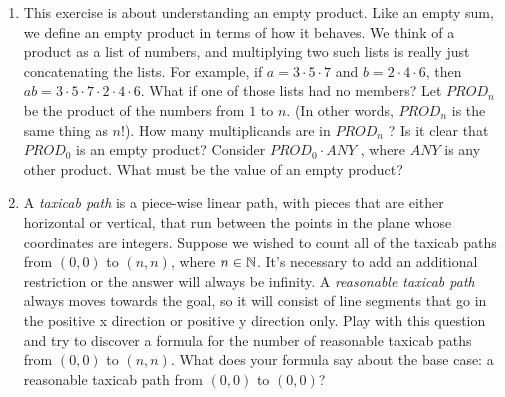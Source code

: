 \documentclass{amsart}
\begin{document}
\begin{enumerate}
\vfill

\item This exercise is about understanding an empty product.  Like an
empty sum, we define an empty product in terms of how it behaves.
We think of a product as a list of numbers, and multiplying two
such lists is really just concatenating the lists.  For example, if
$a = 3 \cdot 5 \cdot 7$ and $b = 2 \cdot 4 \cdot 6$, then $ab = 3 \cdot 5 \cdot 7 \cdot 2 \cdot 4 \cdot 6$.  What if one
of those lists had no members?
Let $PROD_n$ be the product of the numbers from $1$ to $n$. (In other
words, $PROD_n$ is the same thing as $n!$).  How many multiplicands
are in $PROD_n$ ? Is it clear that $PROD_0$ is an empty product?
Consider $PROD_0 \cdot ANY$ , where $ANY$ is any other product.  What
must be the value of an empty product?

\vfill

\newpage

\item A {\em taxicab path} is a piece-wise linear path, with pieces that are either
horizontal or vertical, that run between the points in the plane
whose coordinates are integers.  Suppose we wished to count all of
the taxicab paths from $(0, 0)$ to $(n, n)$, where $n \in {\mathbb N}$.  It’s necessary
to add an additional restriction or the answer will always be infinity.
A {\em reasonable taxicab path} always moves towards the goal, so it
will consist of line segments that go in the positive x direction or
positive y direction only.  Play with this question and try to discover
a formula for the number of reasonable taxicab paths from $(0, 0)$
to $(n, n)$.  What does your formula say about the base case: a
reasonable taxicab path from $(0, 0)$ to $(0, 0)$?

\vfill

\end{enumerate}
\end{document}
